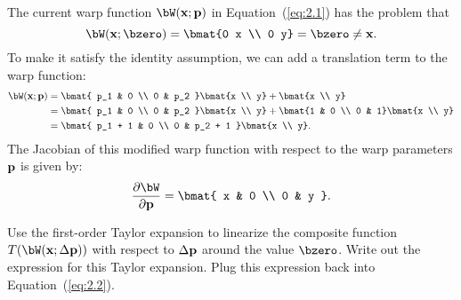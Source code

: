 \begin{problem}
\begin{enumroman}
      \begin{answer}
        The current warp function $\bW(\bx; \bp)$ in Equation~(\ref{eq:2.1})
        has the problem that
        \[
          \bW(\bx; \bzero) = \bmat{0 x \\ 0 y} = \bzero \neq \bx.
        \]
        To make it satisfy the identity assumption, we can add a translation
        term to the warp function:
        \begin{align*}
          \bW(\bx; \bp) &=
          \bmat{ p_1 & 0 \\ 0 & p_2 }
          \bmat{x \\ y} + \bmat{x \\ y} \\
          &= \bmat{ p_1 & 0 \\ 0 & p_2 }
          \bmat{x \\ y} + \bmat{1 & 0 \\ 0 & 1} \bmat{x \\ y} \\
          &= \bmat{ p_1 + 1 & 0 \\ 0 & p_2 + 1 } \bmat{x \\ y}.
        \end{align*}
        The Jacobian of this modified warp function with respect to the warp
        parameters $\mathbf{p}$ is given by:
        \begin{equation}
          \frac{\partial \bW}{\partial \bp} =
          \bmat{ x & 0 \\ 0 & y }.
          \label{eq:ans:2.1}
        \end{equation}
      \end{answer}

    \item Use the first-order Taylor expansion to linearize the composite
      function $T(\bW(\bx; \Delta \bp))$ with respect to $\Delta \mathbf{p}$ around
      the value $\bzero$. Write out the expression for this Taylor expansion.
      Plug this expression back into Equation~(\ref{eq:2.2}).


\end{enumroman}
\end{problem}
